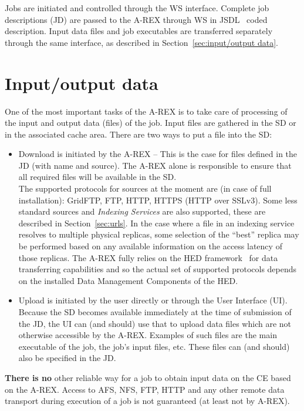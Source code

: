 \documentclass{article}                            %
\begin{document}
Jobs are initiated and controlled through the WS interface. Complete
job descriptions (JD) are passed to the A-REX through WS in
JSDL~\cite{jsdl} coded description. Input data files and job
executables are transferred separately through the same interface, as
described in Section~\ref{sec:input/output data}.

\section{Input/output data\label{sec:input/output data}}

One of the most important tasks of the A-REX is to take care of
processing of the input and output data (files) of the job. Input
files are gathered in the SD or in the associated cache area. There
are two ways to put a file into the SD:

\begin{itemize}
  
\item Download is initiated by the A-REX -- This is the case for files
  defined in the JD (with name and source). The A-REX alone is responsible to
  ensure that all required files will be available in the SD.\\ The supported
  protocols for sources at the moment are (in case of full installation):
  GridFTP, FTP, HTTP, HTTPS (HTTP over SSLv3). Some less standard sources and
  \emph{Indexing Services} are also supported, these are described in
  Section~\ref{sec:urls}. In the case where a file in an indexing service
  resolves to multiple physical replicas, some selection of the ``best'' replica
  may be performed based on any available information on the access latency of
  those replicas. The A-REX fully relies on the HED framework~\cite{hed} for data
  transferring capabilities and so the actual set of supported protocols depends
  on the installed Data Management Components of the HED.

\item Upload is initiated by the user directly or through the User
  Interface (UI). Because the SD becomes available immediately at the
  time of submission of the JD, the UI can (and should) use that to
  upload data files which are not otherwise accessible by the
  A-REX. Examples of such files are the main executable of the job,
  the job's input files, etc.  These files can (and should) also be
  specified in the JD.
\end{itemize}

\textbf{There is no} other reliable way for a job to obtain input data
on the CE based on the A-REX. Access to AFS, NFS, FTP, HTTP and any
other remote data transport during execution of a job is not
guaranteed (at least not by A-REX).
\end{document}
